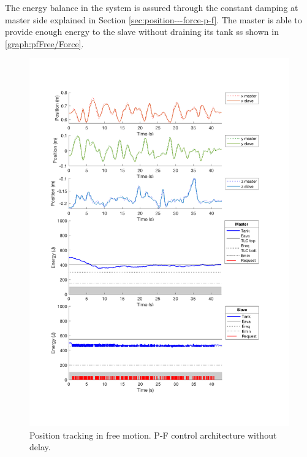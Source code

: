 The energy balance in the system is assured through the constant damping at master side explained in Section \ref{sec:position---force-p-f}.  
The master is able to provide enough energy to the slave without draining its tank ss shown in \figurename{ \ref{graph:pfFree/Force}}.
\begin{center}
	\begin{figure}
		\includegraphics[width=\textwidth, keepaspectratio]{plots/pfFree/Position.pdf}
		\caption{Position tracking in free motion. P-F control architecture without delay.}
		\label{graph:pfFree/Position}
	\end{figure}
\end{center}
